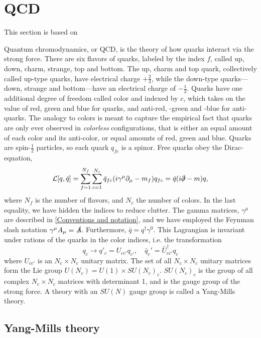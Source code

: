 \section{QCD}
\label{section:QCD}
This section is based on~\cite{Schwartz:QFT,Peskin:IntroQFT,Scherer2002IntroductionTC}

Quantum chromodynamics, or QCD, is the theory of how quarks interact via the strong force.
There are six flavors of quarks, labeled by the index $f$, called up, down, charm, strange, top and bottom.
The up, charm and top quark, collectively called up-type quarks, have electrical charge $+\frac{2}{3}$, while the down-type quarks---down, strange and bottom---have an electrical charge of $-\frac{1}{3}$.
Quarks have one additional degree of freedom called color and indexed by $c$, which takes on the value of red, green and blue for quarks, and anti-red, -green and -blue for anti-quarks.
The analogy to colors is meant to capture the empirical fact that quarks are only ever observed in \emph{colorless} configurations, that is either an equal amount of each color and its anti-color, or equal amounts of red, green and blue.
Quarks are spin-$\frac{1}{2}$ particles, so each quark $q_{fc}$ is a spinor.
Free quarks obey the Dirac-equation,
\begin{equation}
    \mathcal{L}[q, \bar q] = \sum_{f=1}^{N_f} \sum_{c = 1}^{N_c} \bar q_{fc} (i\gamma^\mu \partial_\mu - m_f )q_{fc}
    = \bar q (i\slashed{\partial } - m)q,
\end{equation}
where $N_f$ is the number of flavors, and $N_c$ the number of colors.
In the last equality, we have hidden the indices to reduce clutter.
The gamma matrices, $\gamma^\mu$ are described in \autoref{Conventions and notation}, and we have employed the Feynman slash notation $\gamma^\mu A_\mu = \slashed A$.
Furthermore, $\bar q = q^\dagger \gamma^0$.
This Lagrangian is invariant under rations of the quarks in the color indices, i.e. the transformation
\begin{equation}
    q_c \rightarrow q'_c = U_{cc'} q_{c'},
    \quad 
    \bar q_c' = \bar U_{cc'}^\dagger q_c
\end{equation}
where $U_{cc'}$ is an $N_c \times N_c$ unitary matrix.
The set of all $N_c\times N_c$ unitary matrices form the Lie group $U(N_c) = U(1)\times SU(N_c)_c$.
$SU(N_c)_c$ is the group of all complex $N_c\times N_c$ matrices with determinant 1, and is the gauge group of the strong force.
A theory with an $SU(N)$ gauge group is called a Yang-Mills theory.

\subsection*{Yang-Mills theory}

